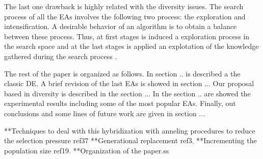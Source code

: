 %
The last one drawback is highly related with the diversity issues.
%
The search process of all the EAs involves the following two process: the exploration and intensification.
%
A desirable behavior of an algorithm is to obtain a balance between these process.
%
Thus, at first stages is induced a exploration process in the search space and at the last stages is applied an explotation of the knowledge gathered during the search process \cite{zaharie2003control}.
%

The rest of the paper is organized as follows.
%
In section .. is described a the classic DE.
%
A brief revision of the last EAs is showed in section ...
%
Our proposal based in diversity is described in the section ...
%
In the section .. are showed the experimental results including some of the most popular EAs.
%
Finally, out conclusions and some lines of future work are given in section ...

   **Techniques to deal with this hybridization with anneling procedures to reduce the selection pressure ref37
   **Generational replacement ref3.
   **Incrementing the population size ref19.
**Organization of the paper.ss
